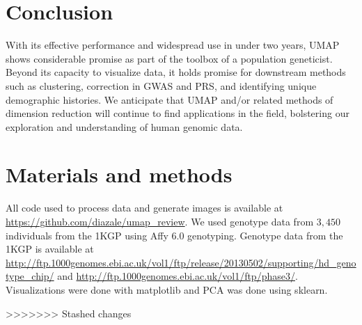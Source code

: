 \documentclass[12pt]{article}
\begin{document}
\section*{Conclusion}
With its effective performance and widespread use in under two years, UMAP shows considerable promise as part of the toolbox of a population geneticist. Beyond its capacity to visualize data, it holds promise for downstream methods such as clustering, correction in GWAS and PRS, and identifying unique demographic histories. We anticipate that UMAP and/or related methods of dimension reduction will continue to find applications in the field, bolstering our exploration and understanding of human genomic data.

\section*{Materials and methods}
All code used to process data and generate images is available at \url{https://github.com/diazale/umap_review}. We used genotype data from $3,450$ individuals from the 1KGP using Affy 6.0 genotyping\cite{10002015global}. Genotype data from the 1KGP is available at \url{http://ftp.1000genomes.ebi.ac.uk/vol1/ftp/release/20130502/supporting/hd_genotype_chip/} and \url{http://ftp.1000genomes.ebi.ac.uk/vol1/ftp/phase3/}. Visualizations were done with matplotlib\cite{Hunter2007} and PCA was done using sklearn\cite{scikit-learn}.

>>>>>>> Stashed changes
\end{document}
